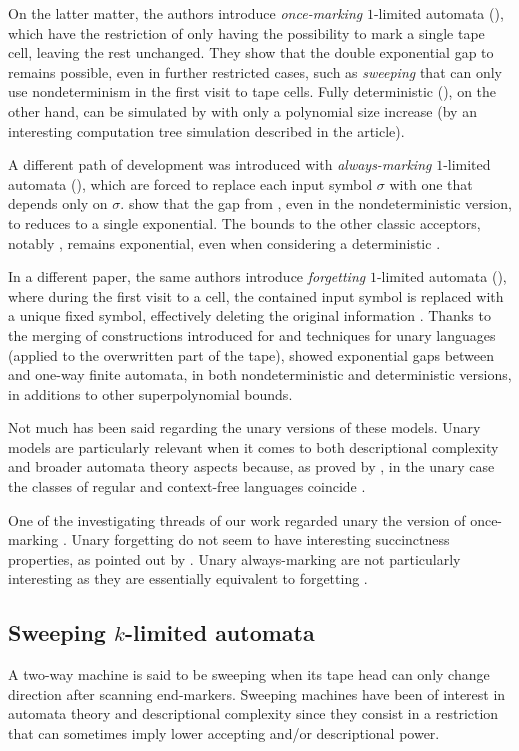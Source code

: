On the latter matter, the authors introduce \emph{once-marking} $1$-limited automata (\OMOLA), which have the restriction of only having the possibility to mark a single tape cell, leaving the rest unchanged.
They show that the double exponential gap to \ODFA remains possible, even in further restricted cases, such as \emph{sweeping} \OMOLA that can only use nondeterminism in the first visit to tape cells.
Fully deterministic \OMOLA (\OMODLA), on the other hand, can be simulated by \TDFA with only a polynomial size increase (by an interesting computation tree simulation described in the article).

A different path of development was introduced with \emph{always-marking} $1$-limited automata (\AMOLA), which are forced to replace each input symbol $\sigma$ with one that depends only on $\sigma$.
\citeauthor{PigPri23a} show that the gap from \AMOLA, even in the nondeterministic version, to \DFA reduces to a single exponential.
The bounds to the other classic acceptors, notably \TNFA, remains exponential, even when considering a deterministic \AMOLA.

In a different paper, the same authors introduce \emph{forgetting} $1$-limited automata (\FOLA), where during the first visit to a cell, the contained input symbol is replaced with a unique fixed symbol, effectively deleting the original information \cite{PigPri23,JanMra+93}.
Thanks to the merging of constructions introduced for \AMOLA and techniques for unary languages (applied to the overwritten part of the tape), \citeauthor{PigPri23} showed exponential gaps between \AMOLA and one-way finite automata, in both nondeterministic and deterministic versions, in additions to other superpolynomial bounds.

Not much has been said regarding the unary versions of these models.
Unary models are particularly relevant when it comes to both descriptional complexity and broader automata theory aspects because, as proved by \citeauthor{GinRic62}, in the unary case the classes of regular and context-free languages coincide \cite{GinRic62}.

One of the investigating threads of our work regarded unary the version of once-marking \OLAs.
Unary forgetting \OLA do not seem to have interesting succinctness properties, as pointed out by \citeauthor{PigPri23} \cite{PigPri23}.
Unary always-marking \OLA are not particularly interesting as they are essentially equivalent to forgetting \OLA.


\subsection{Sweeping \texorpdfstring{$k$}{k}-limited automata}
A two-way machine is said to be sweeping when its tape head can only change direction after scanning end-markers.
Sweeping machines have been of interest in automata theory and descriptional complexity since they consist in a restriction that can sometimes imply lower accepting and/or descriptional power.

